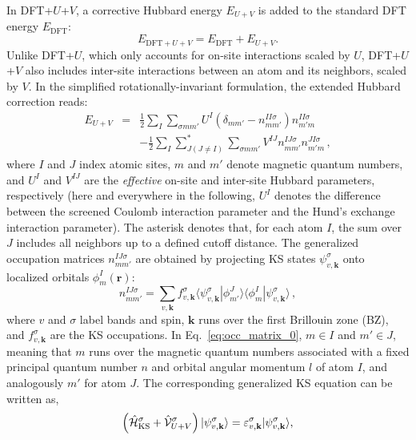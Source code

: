\documentclass[11pt]{article}
\newcommand{\braket}[2] { \langle #1 | #2 \rangle }
\begin{document}
In DFT+$U$+$V$, a corrective Hubbard energy $E_{U+V}$ is added to the standard DFT energy $E_{\mathrm{DFT}}$:
%
\begin{equation}
    E_{\mathrm{DFT}+U+V} = E_{\mathrm{DFT}} + E_{U+V} .
    \label{eq:Edft_plus_uv}
\end{equation}
%
Unlike DFT+$U$, which only accounts for on-site interactions scaled by $U$, DFT+$U$+$V$ also includes inter-site interactions between an atom and its neighbors, scaled by $V$. In the simplified rotationally-invariant formulation, the extended Hubbard correction reads:
%
\begin{eqnarray}
    E_{U+V} & = & \frac{1}{2} \sum_I \sum_{\sigma m m'}
    U^I \left( \delta_{m m'} - n^{II \sigma}_{m m'} \right) n^{II \sigma}_{m' m} \nonumber \\
    & & - \frac{1}{2} \sum_{I} \sum_{J (J \ne I)}^{*} \sum_{\sigma m m'} V^{I J}
    n^{I J \sigma}_{m m'} n^{J I \sigma}_{m' m} \,,
    \label{eq:Edftu}
\end{eqnarray}
%
where $I$ and $J$ index atomic sites, $m$ and $m'$ denote magnetic quantum numbers, and $U^I$ and $V^{IJ}$ are the \textit{effective} on-site and inter-site Hubbard parameters, respectively (here and everywhere in the following, $U^I$ denotes the difference between the screened Coulomb interaction parameter and the Hund's exchange interaction parameter). The asterisk denotes that, for each atom $I$, the sum over $J$ includes all neighbors up to a defined cutoff distance. The generalized occupation matrices $n^{IJ \sigma}_{m m'}$ are obtained by projecting KS states $\psi^\sigma_{v,\mathbf{k}}$ onto localized orbitals $\phi^I_m(\mathbf{r})$:
%
\begin{equation}
    n^{I J \sigma}_{m m'} = \sum_{v,\mathbf{k}} f^\sigma_{v,\mathbf{k}}
    \braket{\psi^\sigma_{v,\mathbf{k}}}{\phi^{J}_{m'}} \braket{\phi^{I}_{m}}{\psi^\sigma_{v,\mathbf{k}}} \,,
    \label{eq:occ_matrix_0}
\end{equation}
%
where $v$ and $\sigma$ label bands and spin, $\mathbf{k}$ runs over the first Brillouin zone (BZ), and $f^\sigma_{v,\mathbf{k}}$ are the KS occupations. In Eq.~\eqref{eq:occ_matrix_0}, $m \in I$ and $m' \in J$, meaning that $m$ runs over the magnetic quantum numbers associated with a fixed principal quantum number $n$ and orbital angular momentum $l$ of atom $I$, and analogously $m'$ for atom $J$. The corresponding generalized KS equation can be written as,
%
\begin{equation}
     \left(\hat{\mathcal H}_\mathrm{KS}^\sigma +
     \hat{\mathcal V}_{U+V}^\sigma \right)|\psi_{v,{\bf k}}^\sigma\rangle
     = \varepsilon_{v,{\bf k}}^\sigma |\psi_{v,{\bf k}}^\sigma\rangle,
\end{equation}
\end{document}
